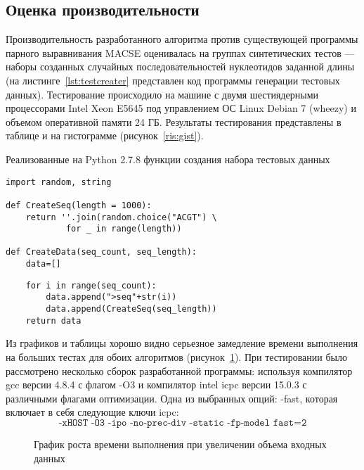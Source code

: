 	

\subsection[Оценка производительности]{\large Оценка производительности}
\hspace{\parindent} Производительность разработанного алгоритма против существующей программы парного выравнивания MACSE оценивалась на группах синтетических тестов --- наборы созданных случайных последовательностей нуклеотидов заданной длины (на листинге~\ref{lst:testcreater} представлен код программы генерации тестовых данных).  Тестирование происходило на машине с двумя шестиядерными процессорами Intel Xeon E5645 под управлением ОС Linux Debian 7 (wheezy) и объемом оперативной памяти 24 ГБ. Результаты тестирования представлены в таблице и на гистограмме (рисунок~\ref{ris:gist}).
\begin{algorithm}[H]
	\caption{Реализованные на Python 2.7.8 функции создания набора тестовых данных} \label{lst:testcreater}
	\begin{lstlisting}
import random, string

def CreateSeq(length = 1000):
    return ''.join(random.choice("ACGT") \
    		for _ in range(length))

def CreateData(seq_count, seq_length):
    data=[]
	\end{lstlisting}
\end{algorithm}

\begin{algorithm}
	\begin{lstlisting}
    for i in range(seq_count):
        data.append(">seq"+str(i))
        data.append(CreateSeq(seq_length))
    return data
	\end{lstlisting}
\end{algorithm}

Из графиков и таблицы хорошо видно серьезное замедление времени выполнения на больших тестах для обоих алгоритмов (рисунок~\ref{ris:multyvsMACSE}). При тестировании было рассмотрено несколько сборок разработанной программы: используя компилятор gcc версии 4.8.4 с флагом -O3 и компилятор intel icpc версии 15.0.3 с различными флагами оптимизации. Одна из выбранных опций: -fast, которая включает в себя следующие ключи icpc:
\begin{equation*}
\texttt{-xHOST -O3 -ipo -no-prec-div -static -fp-model fast=2}
\end{equation*}

\begin{figure}[h]
	\begin{minipage}[h]{0.49\linewidth}
	\end{minipage}
	\hfill
	\begin{minipage}[h]{0.49\linewidth}
	\end{minipage}
	\caption{График роста времени выполнения при увеличении объема входных данных}
	\label{ris:multyvsMACSE}
\end{figure}

